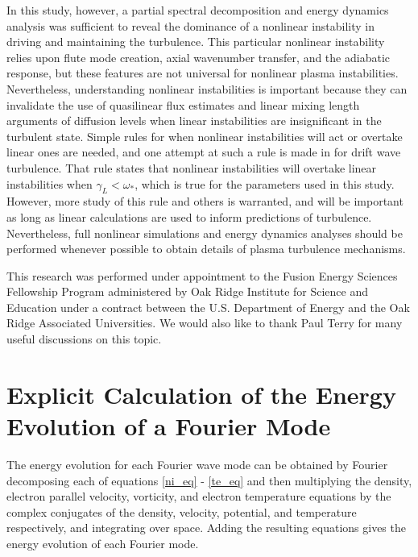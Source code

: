 \documentclass[twocolumn,showpacs,preprintnumbers,amsmath,amssymb]{revtex4}
\begin{document}
In this study, however, a partial spectral decomposition and energy dynamics analysis was sufficient to reveal the dominance of a nonlinear instability in driving and maintaining the turbulence. 
This particular nonlinear instability relies upon flute mode creation, axial wavenumber transfer, and the adiabatic response, but these features are not universal for nonlinear
plasma instabilities. Nevertheless,
understanding nonlinear instabilities is important because they can invalidate the use of quasilinear flux estimates and linear mixing length arguments of diffusion 
levels when linear instabilities are insignificant in the turbulent state. Simple rules for when nonlinear instabilities will act or overtake linear ones are needed, and one attempt at such
a rule is made in \cite{scott2005} for drift wave turbulence. That rule states that nonlinear instabilities will overtake linear instabilities when $\gamma_L < \omega_*$, which is true
for the parameters used in this study. However, more study of this rule and others is warranted, and will be important as long as linear calculations are used to inform predictions of turbulence.
Nevertheless, full nonlinear simulations and energy dynamics analyses should be performed whenever possible to obtain details of plasma turbulence mechanisms.


\begin{acknowledgements}
This research was performed under appointment to the Fusion Energy Sciences Fellowship Program administered by Oak Ridge Institute for
Science and Education under a contract between the U.S. Department of Energy and the Oak Ridge Associated Universities. We would also like to thank Paul Terry for many
useful discussions on this topic.
\end{acknowledgements}



\appendix

\section{Explicit Calculation of the Energy Evolution of a Fourier Mode}

The energy evolution for each Fourier wave mode can be obtained by Fourier decomposing each of equations \ref{ni_eq} - \ref{te_eq}
and then multiplying the density, electron parallel velocity, vorticity, and electron temperature equations by the complex conjugates of the 
density, velocity, potential, and temperature respectively, and integrating over space.
Adding the resulting equations gives the energy evolution of each Fourier mode.
\end{document}
